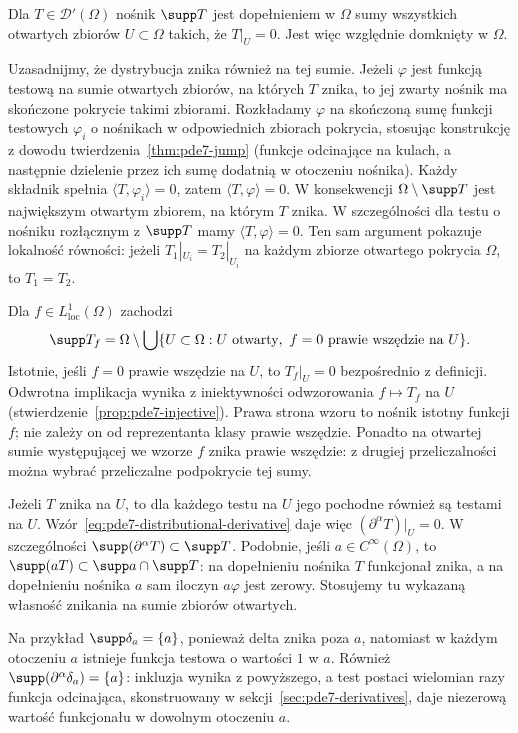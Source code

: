 \begin{definicja}
Dla $T\in\mathcal D'(\Omega)$ nośnik $\supp T$ jest
dopełnieniem w $\Omega$ sumy wszystkich otwartych
zbiorów $U\subset\Omega$ takich, że $T|_U=0$.
Jest więc względnie domknięty w $\Omega$.
\end{definicja}

Uzasadnijmy, że dystrybucja znika również na tej sumie.
Jeżeli $\varphi$ jest funkcją testową na sumie
otwartych zbiorów, na których $T$ znika, to jej
zwarty nośnik ma skończone pokrycie takimi zbiorami.
Rozkładamy $\varphi$ na skończoną sumę funkcji
testowych $\varphi_i$ o nośnikach w odpowiednich
zbiorach pokrycia, stosując konstrukcję z dowodu
twierdzenia~\ref{thm:pde7-jump} (funkcje odcinające
na kulach, a następnie dzielenie przez ich sumę
dodatnią w otoczeniu nośnika).
Każdy składnik spełnia $\langle T,\varphi_i\rangle=0$,
zatem $\langle T,\varphi\rangle=0$.
W konsekwencji $\Omega\setminus\supp T$ jest
największym otwartym zbiorem, na którym $T$ znika.
W szczególności dla testu o nośniku rozłącznym
z $\supp T$ mamy $\langle T,\varphi\rangle=0$.
Ten sam argument pokazuje lokalność równości:
jeżeli $T_1|_{U_i}=T_2|_{U_i}$ na każdym zbiorze
otwartego pokrycia $\Omega$, to $T_1=T_2$.

Dla $f\in L^1_{\mathrm{loc}}(\Omega)$ zachodzi
\[
 \supp T_f=\Omega\setminus
 \bigcup\{U\subset\Omega: U\text{ otwarty},\
 f=0\text{ prawie wszędzie na }U\}.
\]
Istotnie, jeśli $f=0$ prawie wszędzie na $U$,
to $T_f|_U=0$ bezpośrednio z definicji.
Odwrotna implikacja wynika z iniektywności
odwzorowania $f\mapsto T_f$ na $U$
(stwierdzenie~\ref{prop:pde7-injective}).
Prawa strona wzoru to nośnik istotny funkcji $f$;
nie zależy on od reprezentanta klasy prawie wszędzie.
Ponadto na otwartej sumie występującej we wzorze
$f$ znika prawie wszędzie: z drugiej przeliczalności
można wybrać przeliczalne podpokrycie tej sumy.

Jeżeli $T$ znika na $U$, to dla każdego testu na $U$
jego pochodne również są testami na $U$.
Wzór~\eqref{eq:pde7-distributional-derivative} daje
więc $(\partial^\alpha T)|_U=0$. W szczególności
$\supp(\partial^\alpha T)\subset\supp T$.
Podobnie, jeśli $a\in C^\infty(\Omega)$, to
$\supp(aT)\subset\supp a\cap\supp T$:
na dopełnieniu nośnika $T$ funkcjonał znika,
a na dopełnieniu nośnika $a$ sam iloczyn
$a\varphi$ jest zerowy. Stosujemy tu wykazaną
własność znikania na sumie zbiorów otwartych.

Na przykład $\supp\delta_a=\{a\}$, ponieważ
delta znika poza $a$, natomiast w każdym
otoczeniu $a$ istnieje funkcja testowa
o wartości $1$ w $a$. Również
$\supp(\partial^\alpha\delta_a)=\{a\}$:
inkluzja wynika z powyższego, a test postaci
wielomian razy funkcja odcinająca, skonstruowany
w sekcji~\ref{sec:pde7-derivatives}, daje
niezerową wartość funkcjonału w dowolnym
otoczeniu $a$.

